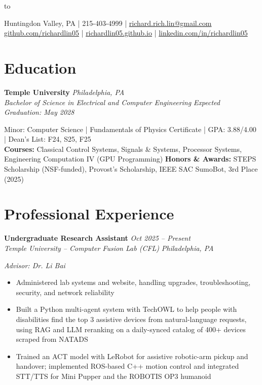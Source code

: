 \documentclass[11pt, letterpaper]{article}
\newcommand{\roleentry}[4]{%
    \noindent\textbf{#1} \hfill \textit{#2} \\
    \textit{#3} \hfill \textit{#4}%
    \vspace{0pt}
}
\begin{document}
\noindent
\hbox to \\[-2pt]
{\centering
    Huntingdon Valley, PA | 215-403-4999 |
    \href{mailto:richard.rich.lin@gmail.com}{richard.rich.lin@gmail.com} \\[-1pt]
    \href{https://github.com/richardlin05}{github.com/richardlin05} |
    \href{https://richardlin05.github.io}{richardlin05.github.io} |
    \href{https://linkedin.com/in/richardlin05}{linkedin.com/in/richardlin05}
    \par}

\vspace{-2pt}

\section{Education}

\roleentry{Temple University}{Philadelphia, PA}%
    {Bachelor of Science in Electrical and Computer Engineering}{Expected Graduation: May 2028} 

\noindent Minor: Computer Science | Fundamentals of Physics Certificate | GPA: 3.88/4.00 | Dean's List: F24, S25, F25 \\
\noindent \textbf{Courses:} Classical Control Systems, Signals \& Systems, Processor Systems, Engineering Computation IV (GPU Programming)
\noindent \textbf{Honors \& Awards:} STEPS Scholarship (NSF-funded), Provost's Scholarship, IEEE SAC SumoBot, 3rd Place (2025)

\vspace{2pt}

\section{Professional Experience}

\roleentry{Undergraduate Research Assistant}{Oct 2025 -- Present}%
    {Temple University -- Computer Fusion Lab (CFL)}{Philadelphia, PA}

\noindent \textit{Advisor: Dr. Li Bai}
\begin{itemize}
    \item Administered lab systems and website, handling upgrades, troubleshooting, security, and network reliability
    \item Built a Python multi-agent system with TechOWL to help people with disabilities find the top 3 assistive devices from natural-language requests, using RAG and LLM reranking on a daily-synced catalog of 400+ devices scraped from NATADS
    \item Trained an ACT model with LeRobot for assistive robotic-arm pickup and handover; implemented ROS-based C++ motion control and integrated STT/TTS for Mini Pupper and the ROBOTIS OP3 humanoid
\end{itemize}
\end{document}
